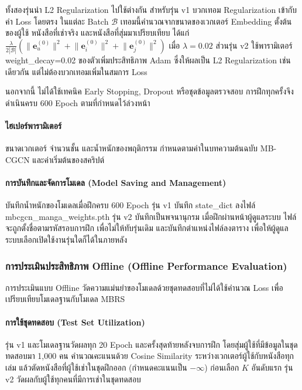 ทั้งสองรุ่นนำ L2 Regularization ไปใช้ต่างกัน สำหรับรุ่น v1 บวกเทอม Regularization เข้ากับค่า Loss โดยตรง ในแต่ละ Batch $\mathcal{B}$ เทอมนี้คำนวณจากขนาดของเวกเตอร์ Embedding ตั้งต้นของผู้ใช้ หนังสือที่เช่าจริง และหนังสือที่สุ่มมาเปรียบเทียบ ได้แก่ $\frac{\lambda}{2|\mathcal{B}|}\left(\lVert\mathbf{e}_u^{(0)}\rVert^2+\lVert\mathbf{e}_i^{(0)}\rVert^2+\lVert\mathbf{e}_j^{(0)}\rVert^2\right)$ เมื่อ $\lambda = 0.02$ ส่วนรุ่น v2 ใช้พารามิเตอร์ weight\_decay=0.02 ของตัวเพิ่มประสิทธิภาพ Adam ซึ่งให้ผลเป็น L2 Regularization เช่นเดียวกัน แต่ไม่ต้องบวกเทอมเพิ่มในสมการ Loss

นอกจากนี้ ไม่ได้ใช้เทคนิค Early Stopping, Dropout หรือชุดข้อมูลตรวจสอบ การฝึกทุกครั้งจึงดำเนินครบ $600$ Epoch ตามที่กำหนดไว้ล่วงหน้า


\paragraph{ไฮเปอร์พารามิเตอร์}
ขนาดเวกเตอร์ จำนวนชั้น และน้ำหนักของพฤติกรรม กำหนดตามค่าในบทความต้นฉบับ MB-CGCN และค่าเริ่มต้นของสคริปต์ 

\paragraph{การบันทึกและจัดการโมเดล (Model Saving and Management)}
บันทึกน้ำหนักของโมเดลเมื่อฝึกครบ 600 Epoch รุ่น v1 บันทึก state\_dict ลงไฟล์ mbcgcn\_manga\_weights.pth รุ่น v2 บันทึกเป็นพจนานุกรม  เมื่อฝึกผ่านหน้าผู้ดูแลระบบ ไฟล์จะถูกตั้งชื่อตามรหัสรอบการฝึก เพื่อไม่ให้ทับรุ่นเดิม และบันทึกตำแหน่งไฟล์ลงตาราง เพื่อให้ผู้ดูแลระบบเลือกเปิดใช้งานรุ่นใดก็ได้ในภายหลัง

\subsubsection{การประเมินประสิทธิภาพ Offline (Offline Performance Evaluation)}
การประเมินแบบ Offline วัดความแม่นยำของโมเดลด้วยชุดทดสอบที่ไม่ได้ใช้คำนวณ Loss เพื่อเปรียบเทียบโมเดลฐานกับโมเดล MBRS

\paragraph{การใช้ชุดทดสอบ (Test Set Utilization)}
รุ่น v1 และโมเดลฐานวัดผลทุก 20 Epoch และครั้งสุดท้ายหลังจบการฝึก โดยสุ่มผู้ใช้ที่มีข้อมูลในชุดทดสอบมา 1,000 คน คำนวณคะแนนด้วย Cosine Similarity ระหว่างเวกเตอร์ผู้ใช้กับหนังสือทุกเล่ม แล้วตัดหนังสือที่ผู้ใช้เช่าในชุดฝึกออก (กำหนดคะแนนเป็น $-\infty$) ก่อนเลือก $K$ อันดับแรก รุ่น v2 วัดผลกับผู้ใช้ทุกคนที่มีการเช่าในชุดทดสอบ

